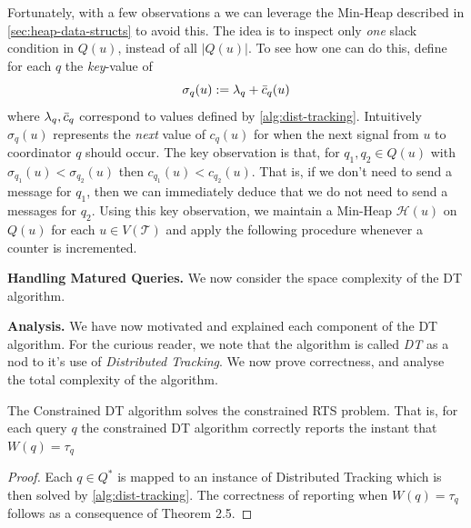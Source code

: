 Fortunately, with a few observations a we can leverage the Min-Heap described in \cref{sec:heap-data-structs} to avoid this. The idea is to inspect only \textit{one} slack condition in $Q(u)$, instead of all $|Q(u)|$. To see how one can do this, define for each $q$ the \textit{key}-value of 
\begin{equation}
    \sigma_q(u) := \lambda_q + \Bar{c}_q(u)
\end{equation}
where $\lambda_q, \Bar{c}_q$ correspond to values defined by \cref{alg:dist-tracking}. Intuitively $\sigma_q(u)$ represents the \textit{next} value of $c_q(u)$ for when the next signal from $u$ to coordinator $q$ should occur. The key observation is that, for $q_1, q_2 \in Q(u)$ with $\sigma_{q_{1}}(u) < \sigma_{q_{2}}(u)$ then $c_{q_1}(u) < c_{q_2}(u)$. That is, if we don't need to send a message for $q_1$, then we can immediately deduce that we do not need to send a messages for $q_2$. Using this key observation, we maintain a Min-Heap $\mathcal{H}(u)$ on $Q(u)$ for each $u\in V(\mathcal{T})$ and apply the following procedure whenever a counter is incremented.

\begin{algorithm}\label{alg:slack-inspection}
\begin{algorithmic}[1]
\State {}
\State {}
\State {}
\Statex {}
\Statex {}
\EndProcedure
\end{algorithmic}
\end{algorithm}

\textbf{Handling Matured Queries.} We now consider the space complexity of the DT algorithm.


\textbf{Analysis.} We have now motivated and explained each component of the DT algorithm. For the curious reader, we note that the algorithm is called \textit{DT} as a nod to it's use of \textit{Distributed Tracking}. We now prove correctness, and analyse the total complexity of the algorithm.

\begin{theorem}[Correctness] The Constrained DT algorithm solves the constrained RTS problem. That is, for each query $q$ the constrained DT algorithm correctly reports the instant that $W(q) = \tau_q$
\end{theorem}
\begin{proof}
    Each $q \in Q^*$ is mapped to an instance of Distributed Tracking which is then solved by \cref{alg:dist-tracking}. The correctness of reporting when $W(q) = \tau_q$ follows as a consequence of Theorem 2.5.
\end{proof}

